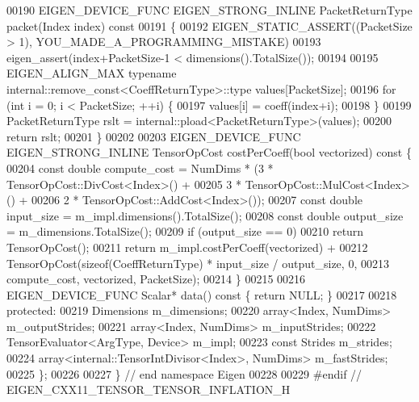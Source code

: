 \begin{DoxyCode}
00190   EIGEN\_DEVICE\_FUNC EIGEN\_STRONG\_INLINE PacketReturnType packet(Index index)\textcolor{keyword}{ const}
00191 \textcolor{keyword}{  }\{
00192     EIGEN\_STATIC\_ASSERT((PacketSize > 1), YOU\_MADE\_A\_PROGRAMMING\_MISTAKE)
00193     eigen\_assert(index+PacketSize-1 < dimensions().TotalSize());
00194 
00195     EIGEN\_ALIGN\_MAX \textcolor{keyword}{typename} internal::remove\_const<CoeffReturnType>::type values[PacketSize];
00196     \textcolor{keywordflow}{for} (\textcolor{keywordtype}{int} i = 0; i < PacketSize; ++i) \{
00197       values[i] = coeff(index+i);
00198     \}
00199     PacketReturnType rslt = internal::pload<PacketReturnType>(values);
00200     \textcolor{keywordflow}{return} rslt;
00201   \}
00202 
00203   EIGEN\_DEVICE\_FUNC EIGEN\_STRONG\_INLINE TensorOpCost costPerCoeff(\textcolor{keywordtype}{bool} vectorized)\textcolor{keyword}{ const }\{
00204     \textcolor{keyword}{const} \textcolor{keywordtype}{double} compute\_cost = NumDims * (3 * TensorOpCost::DivCost<Index>() +
00205                                            3 * TensorOpCost::MulCost<Index>() +
00206                                            2 * TensorOpCost::AddCost<Index>());
00207     \textcolor{keyword}{const} \textcolor{keywordtype}{double} input\_size = m\_impl.dimensions().TotalSize();
00208     \textcolor{keyword}{const} \textcolor{keywordtype}{double} output\_size = m\_dimensions.TotalSize();
00209     \textcolor{keywordflow}{if} (output\_size == 0)
00210       \textcolor{keywordflow}{return} TensorOpCost();
00211     \textcolor{keywordflow}{return} m\_impl.costPerCoeff(vectorized) +
00212            TensorOpCost(\textcolor{keyword}{sizeof}(CoeffReturnType) * input\_size / output\_size, 0,
00213                         compute\_cost, vectorized, PacketSize);
00214   \}
00215 
00216   EIGEN\_DEVICE\_FUNC Scalar* data()\textcolor{keyword}{ const }\{ \textcolor{keywordflow}{return} NULL; \}
00217 
00218  \textcolor{keyword}{protected}:
00219   Dimensions m\_dimensions;
00220   array<Index, NumDims> m\_outputStrides;
00221   array<Index, NumDims> m\_inputStrides;
00222   TensorEvaluator<ArgType, Device> m\_impl;
00223   \textcolor{keyword}{const} Strides m\_strides;
00224   array<internal::TensorIntDivisor<Index>, NumDims> m\_fastStrides;
00225 \};
00226 
00227 \} \textcolor{comment}{// end namespace Eigen}
00228 
00229 \textcolor{preprocessor}{#endif // EIGEN\_CXX11\_TENSOR\_TENSOR\_INFLATION\_H}
\end{DoxyCode}
